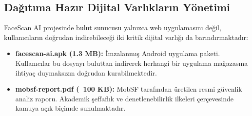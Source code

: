 \subsection{Dağıtıma Hazır Dijital Varlıkların Yönetimi}

FaceScan AI projesinde bulut sunucusu yalnızca web uygulamasını değil, kullanıcıların doğrudan indirebileceği iki kritik dijital varlığı da barındırmaktadır:
\begin{itemize}
  \item \textbf{facescan-ai.apk (1.3 MB):} İmzalanmış Android uygulama paketi. Kullanıcılar bu dosyayı buluttan indirerek herhangi bir uygulama mağazasına ihtiyaç duymaksızın doğrudan kurabilmektedir.
  \item \textbf{mobsf-report.pdf (~100 KB):} MobSF tarafından üretilen resmi güvenlik analiz raporu. Akademik şeffaflık ve denetlenebilirlik ilkeleri çerçevesinde kamuya açık biçimde sunulmaktadır.
\end{itemize}
